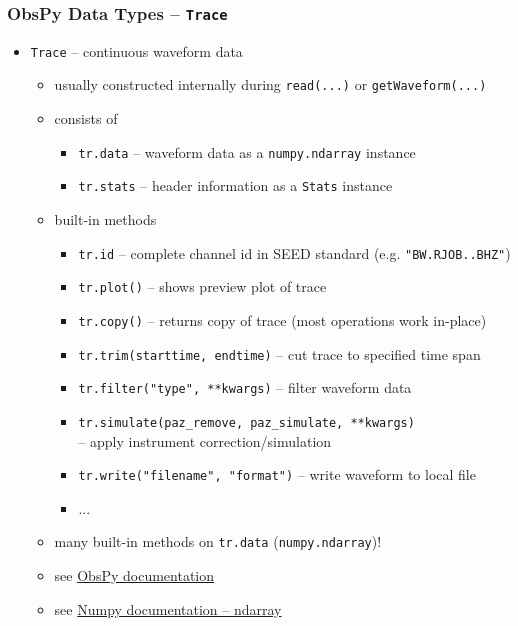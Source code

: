 \documentclass[t,10pt,compress=false,usepdftitle=false]{beamer}
\begin{document}
\begin{frame}[fragile]
    \frametitle{ObsPy Data Types -- \tt{Trace}}
    \begin{itemize}
    \item \verb#Trace# -- continuous waveform data
        \begin{itemize}
        \item usually constructed internally during \verb#read(...)# or \verb#getWaveform(...)#
        \item consists of
            \begin{itemize}
            \item \verb#tr.data# -- waveform data as a \verb#numpy.ndarray# instance
            \item \verb#tr.stats# -- header information as a \verb#Stats# instance
            \end{itemize}
        \item built-in methods
            \begin{itemize}
            \item \verb#tr.id# -- complete channel id in SEED standard (e.g. \verb#"BW.RJOB..BHZ"#)
            \item \verb#tr.plot()# -- shows preview plot of trace
            \item \verb#tr.copy()# -- returns copy of trace (most operations work in-place)
            \item \verb#tr.trim(starttime, endtime)# -- cut trace to specified time span
            \item \verb#tr.filter("type", **kwargs)# -- filter waveform data
            \item \verb#tr.simulate(paz_remove, paz_simulate, **kwargs)#\\ -- apply instrument correction/simulation
            \item \verb#tr.write("filename", "format")# -- write waveform to local file
            \item ...
            \end{itemize}
        \item many built-in methods on \verb#tr.data# (\verb#numpy.ndarray#)!
        \item see \href{file:///home/messuser/obspy/docs/packages/auto/obspy.core.trace.Trace.html}{ObsPy documentation}
        \item see \href{file:///home/messuser/obspy/python/numpy-docs/index.html}{Numpy documentation -- ndarray}
        \end{itemize}
    \end{itemize}
\end{frame}
\end{document}
